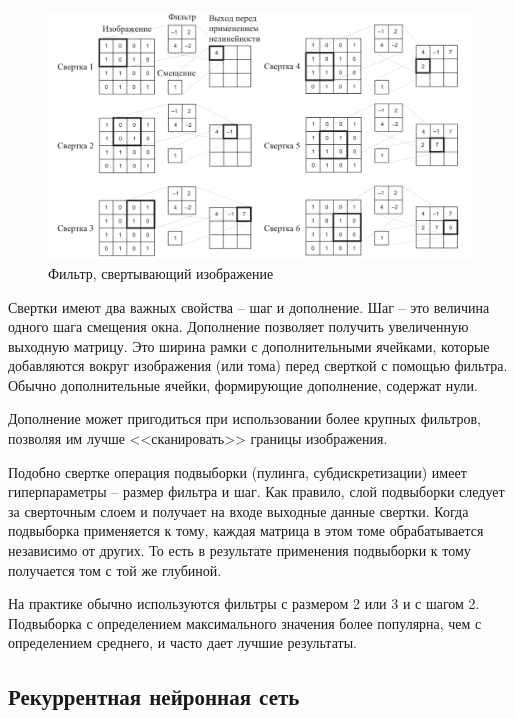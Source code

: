 \documentclass[%
	11pt,
	a4paper,
	utf8,
		]{article}
\begin{document}
\begin{figure}[h]
	\centering
	\includegraphics[scale=0.7]{figures/conv-3.png}
	\caption{ Фильтр, свертывающий изображение }\label{fig:conv-3}
\end{figure}

Свертки имеют два важных свойства -- шаг и дополнение. Шаг -- это величина одного шага смещения окна. Дополнение позволяет получить увеличенную выходную матрицу. Это ширина рамки с дополнительными ячейками, которые добавляются вокруг изображения (или тома) перед сверткой с помощью фильтра. Обычно дополнительные ячейки, формирующие дополнение, содержат нули.

Дополнение может пригодиться при использовании более крупных фильтров, позволяя им лучше <<сканировать>> границы изображения.

Подобно свертке операция подвыборки (пулинга, субдискретизации) имеет гиперпараметры -- размер фильтра и шаг. Как правило, слой подвыборки следует за сверточным слоем и получает на входе выходные данные свертки. Когда подвыборка применяется к тому, каждая матрица в этом томе обрабатывается независимо от других. То есть в результате применения подвыборки к тому получается том с той же глубиной.


На практике обычно используются фильтры с размером 2 или 3 и с шагом 2. Подвыборка с определением максимального значения более популярна, чем с определением среднего, и часто дает лучшие результаты.

\subsection{Рекуррентная нейронная сеть}
\end{document}
